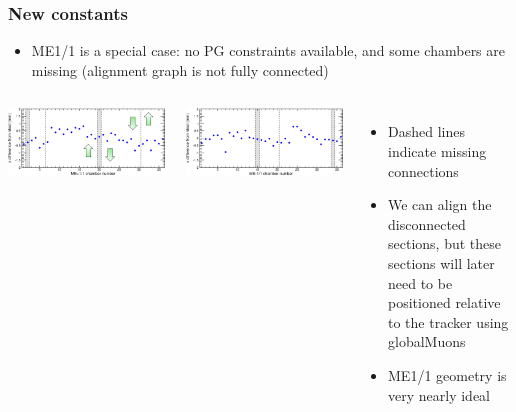 \documentclass[compress]{beamer}
\begin{document}
\begin{frame}
\frametitle{New constants}

\begin{itemize}
\item ME1/1 is a special case: no PG constraints available, and some
  chambers are missing (alignment graph is not fully connected)
\end{itemize}

\begin{columns}
\includegraphics[width=\linewidth]{dependence_on_weights_p11.png}

\includegraphics[width=\linewidth]{dependence_on_weights_m11.png}

\begin{itemize}
\item Dashed lines indicate missing connections

\item We can align the disconnected sections, but these sections will
  later need to be positioned relative to the tracker using
  globalMuons

\item ME1/1 geometry is very nearly ideal
\end{itemize}
\end{columns}
\end{frame}
\end{document}
